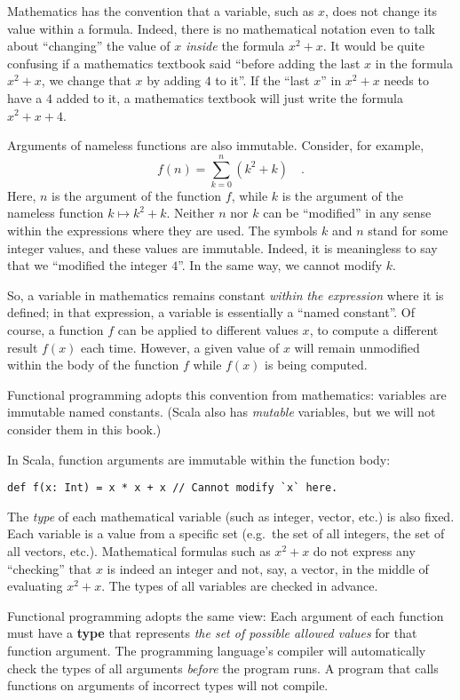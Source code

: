 Mathematics has the convention that a variable, such as $x$, does
not change its value within a formula. Indeed, there is no mathematical
notation even to talk about ``changing'' the value of $x$ \emph{inside}
the formula $x^{2}+x$. It would be quite confusing if a mathematics
textbook said ``before adding the last $x$ in the formula $x^{2}+x$,
we change that $x$ by adding $4$ to it''. If the ``last $x$''
in $x^{2}+x$ needs to have a $4$ added to it, a mathematics textbook
will just write the formula $x^{2}+x+4$.

Arguments of nameless functions are also immutable. Consider, for
example,
\[
f(n)=\sum_{k=0}^{n}(k^{2}+k)\quad.
\]
Here, $n$ is the argument of the function $f$, while $k$ is the
argument of the nameless function $k\mapsto k^{2}+k$. Neither $n$
nor $k$ can be ``modified'' in any sense within the expressions
where they are used. The symbols $k$ and $n$ stand for some integer
values, and these values are immutable. Indeed, it is meaningless
to say that we ``modified the integer $4$''. In the same way, we
cannot modify $k$.

So, a variable in mathematics remains constant \emph{within} \emph{the
expression} where it is defined; in that expression, a variable is
essentially a ``named constant''. Of course, a function $f$ can
be applied to different values $x$, to compute a different result
$f(x)$ each time. However, a given value of $x$ will remain unmodified
within the body of the function $f$ while $f(x)$ is being computed.

Functional programming adopts this convention from mathematics: variables
are immutable named constants. (Scala also has \emph{mutable} variables,
but we will not consider them in this book.)

In Scala, function arguments are immutable within the function body:
\begin{lstlisting}
def f(x: Int) = x * x + x // Cannot modify `x` here.
\end{lstlisting}

The \emph{type} of each mathematical variable (such as integer, vector,
etc.) is also fixed. Each variable is a value from a specific set
(e.g.~the set of all integers, the set of all vectors, etc.). Mathematical
formulas such as $x^{2}+x$ do not express any ``checking'' that
$x$ is indeed an integer and not, say, a vector, in the middle of
evaluating $x^{2}+x$. The types of all variables are checked in advance.

Functional programming adopts the same view: Each argument of each
function must have a \textbf{type} that represents \emph{the
set of possible allowed values} for that function argument. The programming
language's compiler will automatically check the types of all arguments
\emph{before} the program runs. A program that calls functions on
arguments of incorrect types will not compile.

